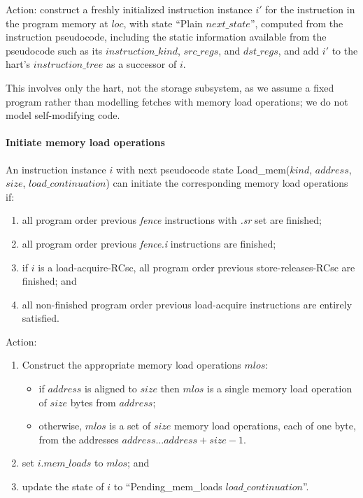 Action: construct a freshly initialized instruction instance $i'$ for the instruction in the program memory at $loc$, with state ``{\sc Plain} $next\_state$'', computed from the instruction pseudocode, including the static information available from the pseudocode such as its $instruction\_kind$, $src\_regs$, and $dst\_regs$, and add $i'$ to the hart's $instruction\_tree$ as a successor of $i$.

\begin{commentary}
This involves only the hart, not the storage subsystem, as we assume a fixed program rather than modelling fetches with memory load operations; we do not model self-modifying code.
\end{commentary}


\paragraph{Initiate memory load operations}\label{omm:hart:initiate_load}
An instruction instance $i$ with next pseudocode state {\sc Load\_mem}($kind$, $address$, $size$, $load\_continuation$) can initiate the corresponding memory load operations if:
\begin{enumerate}
\item all program order previous {\em fence} instructions with {\em .sr} set are finished;
\item all program order previous {\em fence.i} instructions are finished; 
\item if $i$ is a load-acquire-RCsc, all program order previous store-releases-RCsc are finished; and
\item all non-finished program order previous load-acquire instructions are entirely satisfied.
\end{enumerate}
Action:
\begin{enumerate}
\item Construct the appropriate memory load operations $mlos$:
  \begin{itemize}
  \item if $address$ is aligned to $size$ then $mlos$ is a single memory load operation of $size$ bytes from $address$;
  \item otherwise, $mlos$ is a set of $size$ memory load operations, each of one byte, from the addresses $address\ldots address+size-1$.
  \end{itemize}
\item set $i.mem\_loads$ to $mlos$; and
\item update the state of $i$ to ``{\sc Pending\_mem\_loads} $load\_continuation$''.
\end{enumerate}

